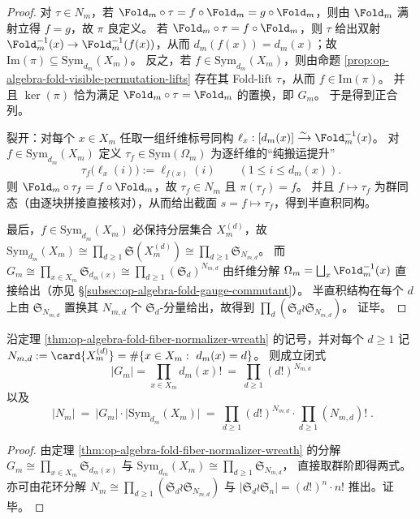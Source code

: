 \begin{proof}
对 \(\tau\in N_m\)，若 \(\Fold_m\circ\tau=f\circ\Fold_m=g\circ\Fold_m\)，则由 \(\Fold_m\) 满射立得 \(f=g\)，故 \(\pi\) 良定义。
若 \(\Fold_m\circ\tau=f\circ\Fold_m\)，则 \(\tau\) 给出双射 \(\Fold_m^{-1}(x)\to\Fold_m^{-1}(f(x))\)，从而 \(d_m(f(x))=d_m(x)\)；故 \(\mathrm{Im}(\pi)\subseteq \mathrm{Sym}_{d_m}(X_m)\)。
反之，若 \(f\in \mathrm{Sym}_{d_m}(X_m)\)，则由命题 \ref{prop:op-algebra-fold-visible-permutation-lifts} 存在其 Fold-lift \(\tau\)，从而 \(f\in\mathrm{Im}(\pi)\)。
并且 \(\ker(\pi)\) 恰为满足 \(\Fold_m\circ\tau=\Fold_m\) 的置换，即 \(G_m\)。
于是得到正合列。
\par
裂开：对每个 \(x\in X_m\) 任取一组纤维标号同构
\(
\ell_x:[d_m(x)]\xrightarrow{\sim}\Fold_m^{-1}(x)
\)。
对 \(f\in\mathrm{Sym}_{d_m}(X_m)\) 定义 \(\tau_f\in \mathrm{Sym}(\Omega_m)\) 为逐纤维的“纯搬运提升”
\[
\tau_f\bigl(\ell_x(i)\bigr):=\ell_{f(x)}(i)\qquad(1\le i\le d_m(x)).
\]
则 \(\Fold_m\circ\tau_f=f\circ\Fold_m\)，故 \(\tau_f\in N_m\) 且 \(\pi(\tau_f)=f\)。
并且 \(f\mapsto \tau_f\) 为群同态（由逐块拼接直接核对），从而给出截面 \(s=f\mapsto \tau_f\)，得到半直积同构。
\par
最后，\(f\in \mathrm{Sym}_{d_m}(X_m)\) 必保持分层集合 \(X_m^{(d)}\)，故
\(
\mathrm{Sym}_{d_m}(X_m)\cong\prod_{d\ge 1}\mathfrak S(X_m^{(d)})\cong\prod_{d\ge 1}\mathfrak S_{N_{m,d}}
\)。
而 \(G_m\cong\prod_{x\in X_m}\mathfrak S_{d_m(x)}\cong\prod_{d\ge 1}(\mathfrak S_d)^{N_{m,d}}\) 由纤维分解 \(\Omega_m=\bigsqcup_x\Fold_m^{-1}(x)\) 直接给出（亦见 \S\ref{subsec:op-algebra-fold-gauge-commutant}）。
半直积结构在每个 \(d\) 上由 \(\mathfrak S_{N_{m,d}}\) 置换其 \(N_{m,d}\) 个 \(\mathfrak S_d\)-分量给出，故得到 \(\prod_d(\mathfrak S_d\wr \mathfrak S_{N_{m,d}})\)。
证毕。
\end{proof}

\begin{corollary}\label{cor:op-algebra-fold-group-orders}
沿定理 \ref{thm:op-algebra-fold-fiber-normalizer-wreath} 的记号，并对每个 \(d\ge 1\) 记
\(
N_{m,d}:=\card{X_m^{(d)}}=\#\{x\in X_m:\ d_m(x)=d\}
\)。
则成立闭式
\[
\boxed{\;
|G_m|=\prod_{x\in X_m} d_m(x)!\ =\ \prod_{d\ge 1}(d!)^{N_{m,d}}\;}
\]
以及
\[
\boxed{\;
|N_m|
\ =\ 
|G_m|\cdot\bigl|\mathrm{Sym}_{d_m}(X_m)\bigr|
\ =\ 
\prod_{d\ge 1}(d!)^{N_{m,d}}\cdot \prod_{d\ge 1}(N_{m,d})!\; }.
\]
\end{corollary}
\begin{proof}
由定理 \ref{thm:op-algebra-fold-fiber-normalizer-wreath} 的分解
\(
G_m\cong\prod_{x\in X_m}\mathfrak S_{d_m(x)}
\)
与
\(
\mathrm{Sym}_{d_m}(X_m)\cong \prod_{d\ge 1}\mathfrak S_{N_{m,d}}
\)，
直接取群阶即得两式。
亦可由花环分解 \(N_m\cong\prod_{d\ge 1}(\mathfrak S_d\wr \mathfrak S_{N_{m,d}})\) 与
\(|\mathfrak S_d\wr \mathfrak S_n|=(d!)^{n}\cdot n!\) 推出。证毕。
\end{proof}

